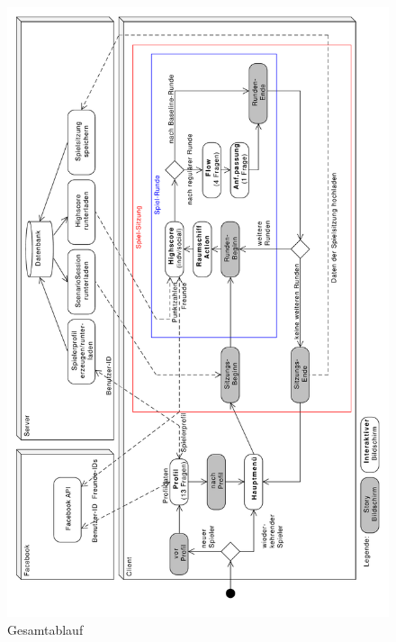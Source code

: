 \documentclass[a4paper,12pt]{scrartcl}
\begin{document}
\begin{figure}[htp]
\begin{center}
  \includegraphics[width=\textwidth,height=\textheight,keepaspectratio]{Gesamtablauf}
  \caption[Gesamtablauf]{Gesamtablauf}
  \label{fig:Gesamtablauf}
\end{center}
\end{figure} 

%

\clearpage
{}
\listoffigures
  
\clearpage
{}
{}

\end{document}
